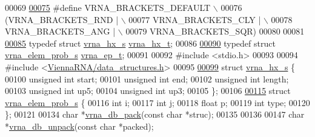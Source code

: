 \begin{DoxyCode}
00069 
\hyperlink{group__struct__utils_ga559ebf76b1b289f85309f4206e99aa1a}{00075} \textcolor{preprocessor}{#define VRNA\_BRACKETS\_DEFAULT  \(\backslash\)}
00076 \textcolor{preprocessor}{  (VRNA\_BRACKETS\_RND | \(\backslash\)}
00077 \textcolor{preprocessor}{   VRNA\_BRACKETS\_CLY | \(\backslash\)}
00078 \textcolor{preprocessor}{   VRNA\_BRACKETS\_ANG | \(\backslash\)}
00079 \textcolor{preprocessor}{   VRNA\_BRACKETS\_SQR)}
00080 
00081 
\hyperlink{group__struct__utils_ga877363f3a1703b53ecd025c6fcf897a0}{00085} \textcolor{keyword}{typedef} \textcolor{keyword}{struct }\hyperlink{group__struct__utils_structvrna__hx__s}{vrna\_hx\_s} \hyperlink{group__struct__utils_structvrna__hx__s}{vrna\_hx\_t};
00086 
\hyperlink{group__struct__utils_gab9ac98ab55ded9fb90043b024b915aca}{00090} \textcolor{keyword}{typedef} \textcolor{keyword}{struct }\hyperlink{group__struct__utils_structvrna__elem__prob__s}{vrna\_elem\_prob\_s} \hyperlink{group__struct__utils_structvrna__elem__prob__s}{vrna\_ep\_t};
00091 
00092 \textcolor{preprocessor}{#include <stdio.h>}
00093 
00094 \textcolor{preprocessor}{#include <\hyperlink{data__structures_8h}{ViennaRNA/data\_structures.h}>}
00095 
\hyperlink{group__struct__utils}{00099} \textcolor{keyword}{struct }\hyperlink{group__struct__utils_structvrna__hx__s}{vrna\_hx\_s} \{
00100   \textcolor{keywordtype}{unsigned} \textcolor{keywordtype}{int}  start;
00101   \textcolor{keywordtype}{unsigned} \textcolor{keywordtype}{int}  end;
00102   \textcolor{keywordtype}{unsigned} \textcolor{keywordtype}{int}  length;
00103   \textcolor{keywordtype}{unsigned} \textcolor{keywordtype}{int}  up5;
00104   \textcolor{keywordtype}{unsigned} \textcolor{keywordtype}{int}  up3;
00105 \};
00106 
\hyperlink{group__struct__utils}{00115} \textcolor{keyword}{struct }\hyperlink{group__struct__utils_structvrna__elem__prob__s}{vrna\_elem\_prob\_s} \{
00116   \textcolor{keywordtype}{int}   i;
00117   \textcolor{keywordtype}{int}   j;
00118   \textcolor{keywordtype}{float} p;
00119   \textcolor{keywordtype}{int}   type;
00120 \};
00121 
00134 \textcolor{keywordtype}{char} *\hyperlink{group__struct__utils_ga55c4783060a1464f862f858d5599c9e1}{vrna\_db\_pack}(\textcolor{keyword}{const} \textcolor{keywordtype}{char} *struc);
00135 
00136 
00147 \textcolor{keywordtype}{char} *\hyperlink{group__struct__utils_ga6490adff857d84ce06e6f379ae3a4512}{vrna\_db\_unpack}(\textcolor{keyword}{const} \textcolor{keywordtype}{char} *packed);

\end{DoxyCode}

